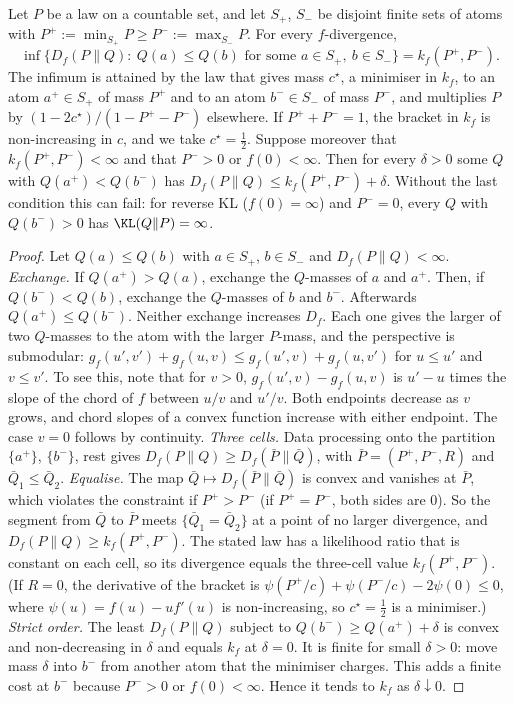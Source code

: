 \begin{lemma}\label{lem:merge}
\Pv\Ck Let $P$ be a law on a countable set, and let $S_+$, $S_-$ be disjoint finite sets of atoms with
$P^+:=\min_{S_+}P\ge P^-:=\max_{S_-}P$. For every $f$-divergence,
\[
\inf\big\{D_f(P\|Q):\ Q(a)\le Q(b)\text{ for some }a\in S_+,\ b\in S_-\big\}=k_f(P^+,P^-).
\]
The infimum is attained by the law that gives mass $c^\star$, a minimiser in $k_f$, to an atom $a^+\in S_+$ of
mass $P^+$ and to an atom $b^-\in S_-$ of mass $P^-$, and multiplies $P$ by $(1-2c^\star)/(1-P^+-P^-)$
elsewhere. If $P^++P^-=1$, the bracket in $k_f$ is non-increasing in $c$, and we take $c^\star=\frac12$.
Suppose moreover that $k_f(P^+,P^-)<\infty$ and that $P^->0$ or $f(0)<\infty$. Then for every $\delta>0$ some $Q$
with $Q(a^+)<Q(b^-)$ has $D_f(P\|Q)\le k_f(P^+,P^-)+\delta$. Without the last condition this can fail: for
reverse KL ($f(0)=\infty$) and $P^-=0$, every $Q$ with $Q(b^-)>0$ has $\KL(Q\|P)=\infty$.
\end{lemma}
\begin{proof}
Let $Q(a)\le Q(b)$ with $a\in S_+$, $b\in S_-$ and $D_f(P\|Q)<\infty$.
\emph{Exchange.} If $Q(a^+)>Q(a)$, exchange the $Q$-masses of $a$ and $a^+$. Then, if $Q(b^-)<Q(b)$,
exchange the $Q$-masses of $b$ and $b^-$. Afterwards $Q(a^+)\le Q(b^-)$. Neither exchange increases $D_f$.
Each one gives the larger of two $Q$-masses to the atom with the larger $P$-mass, and the perspective is
submodular: $g_f(u',v')+g_f(u,v)\le g_f(u',v)+g_f(u,v')$ for $u\le u'$ and $v\le v'$. To see this, note
that for $v>0$, $g_f(u',v)-g_f(u,v)$ is $u'-u$ times the slope of the chord of $f$ between $u/v$ and $u'/v$.
Both endpoints decrease as $v$ grows, and chord slopes of a convex function increase with either
endpoint. The case $v=0$ follows by continuity.
\emph{Three cells.} Data processing onto the partition $\{a^+\}$, $\{b^-\}$, rest gives
$D_f(P\|Q)\ge D_f(\bar P\|\bar Q)$, with $\bar P=(P^+,P^-,R)$ and $\bar Q_1\le\bar Q_2$.
\emph{Equalise.} The map $\bar Q\mapsto D_f(\bar P\|\bar Q)$ is convex and vanishes at $\bar P$, which violates the
constraint if $P^+>P^-$ (if $P^+=P^-$, both sides are $0$). So the segment from $\bar Q$ to $\bar P$ meets
$\{\bar Q_1=\bar Q_2\}$ at a point of no larger divergence, and $D_f(P\|Q)\ge k_f(P^+,P^-)$. The stated law
has a likelihood ratio that is constant on each cell, so its divergence equals the three-cell value
$k_f(P^+,P^-)$. (If $R=0$, the derivative of the bracket is $\psi(P^+/c)+\psi(P^-/c)-2\psi(0)\le0$, where
$\psi(u)=f(u)-uf'(u)$ is non-increasing, so $c^\star=\frac12$ is a minimiser.)
\emph{Strict order.} The least $D_f(P\|Q)$ subject to $Q(b^-)\ge Q(a^+)+\delta$ is convex and non-decreasing
in $\delta$ and equals $k_f$ at $\delta=0$. It is finite for small $\delta>0$: move mass $\delta$ into $b^-$ from
another atom that the minimiser charges. This adds a finite cost at $b^-$ because $P^->0$ or $f(0)<\infty$.
Hence it tends to $k_f$ as $\delta\downarrow0$.
\end{proof}

